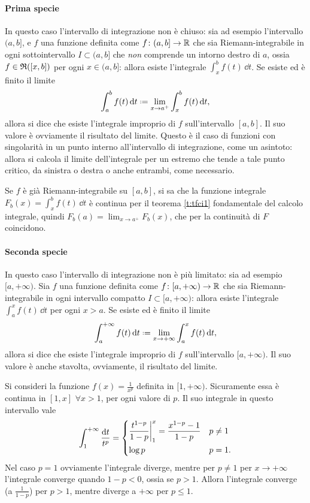 \paragraph{Prima specie}
In questo caso l'intervallo di integrazione non è chiuso: sia ad esempio l'intervallo $(a,b]$, e $f$ una funzione definita come $f\colon(a,b]\to\mathbb{R}$ che sia Riemann-integrabile in ogni sottointervallo $I\subset(a,b]$ che \emph{non} comprende un intorno destro di $a$, ossia $f\in\mathfrak{R}([x,b])$ per ogni $x\in(a,b]$: allora esiste l'integrale $\int_x^bf(t)\,\dd t$.  Se esiste ed è finito il limite
\[
\int_a^bf(t)\,\dd t\defeq\lim_{x\to a^+}\int_x^bf(t)\,\dd t,
\]
allora si dice che esiste l'integrale improprio di $f$ sull'intervallo $[a,b]$. Il suo valore è ovviamente il risultato del limite.
Questo è il caso di funzioni con singolarità in un punto interno all'intervallo di integrazione, come un asintoto: allora si calcola il limite dell'integrale per un estremo che tende a tale punto critico, da sinistra o destra o anche entrambi, come necessario.
\begin{osservazione}
Se $f$ è già Riemann-integrabile su $[a,b]$, si sa che la funzione integrale $F_b(x)=\int_x^bf(t)\,\dd t$ è continua per il teorema \ref{t:tfci1} fondamentale del calcolo integrale, quindi $F_b(a)=\lim_{x\to a^+}F_b(x)$, che per la continuità di $F$ coincidono.
\end{osservazione}
\paragraph{Seconda specie}
In questo caso l'intervallo di integrazione non è più limitato: sia ad esempio $[a,+\infty)$.
Sia $f$ una funzione definita come $f\colon[a,+\infty)\to\mathbb{R}$ che sia Riemann-integrabile in ogni intervallo compatto $I\subset[a,+\infty)$: allora esiste l'integrale $\int_a^xf(t)\,\dd t$ per ogni $x>a$.
Se esiste ed è finito il limite
\[
\int_a^{+\infty} f(t)\,\dd t\defeq\lim_{x\to+\infty}\int_a^xf(t)\,\dd t,
\]
allora si dice che esiste l'integrale improprio di $f$ sull'intervallo $[a,+\infty)$. Il suo valore è anche stavolta, ovviamente, il risultato del limite.

Si consideri la funzione $f(x)=\frac1{x^p}$ definita in $[1,+\infty)$. Sicuramente essa è continua in $[1,x]$ $\forall x>1$, per ogni valore di $p$. Il suo integrale in questo intervallo vale
\[
\int_1^{+\infty}\frac{\textup{d} t}{t^p}=
\begin{dcases}
	\frac{t^{1-p}}{1-p}\bigg|_1^x=\frac{x^{1-p}-1}{1-p}	&p\neq 1\\
	\log p											&p=1.
\end{dcases}
\]
Nel caso $p=1$ ovviamente l'integrale diverge, mentre per $p\neq 1$ per $x\to+\infty$ l'integrale converge quando $1-p<0$, ossia se $p>1$.
Allora l'integrale converge (a $\frac1{1-p}$) per $p>1$, mentre diverge a $+\infty$ per $p\leq 1$.

